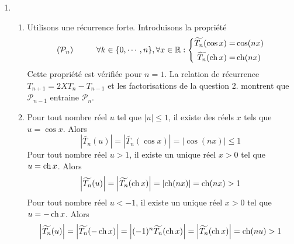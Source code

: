 \begin{enumerate}
\item \begin{enumerate}
 \item Utilisons une récurrence forte. Introduisons la propriété 
\begin{displaymath}
 (\mathcal P_n)\hspace{1cm}\forall k\in\{0,\cdots,n\}, \forall x\in \mathbb{R} :
\left\lbrace
\begin{aligned}
 \widetilde{T_n}(\cos x) =& \cos (nx) \\
 \widetilde{T_n}(\operatorname{ch} x) =& \operatorname{ch} (nx)
\end{aligned}
 \right. 
\end{displaymath}
Cette propriété est vérifiée pour $n=1$. La relation de récurrence $T_{n+1} = 2XT_n - T_{n-1}$ et les factorisations de la question 2. montrent que $\mathcal P_{n-1}$ entraine $\mathcal P_n$.
\item Pour tout nombre réel $u$ tel que $|u|\leq 1$, il existe des réels $x$ tels que $u=\cos x$. Alors
\begin{displaymath}
 \left \vert \widetilde{T_n}(u)\right\vert= \left \vert \widetilde{T_n}(\cos x)\right\vert
= \left \vert \cos(nx)\right\vert \leq 1
\end{displaymath}
Pour tout nombre réel $u>1$, il existe un unique réel $x>0$ tel que $u=\operatorname{ch} x$. Alors
\begin{displaymath}
 \left \vert \widetilde{T_n}(u)\right\vert= \left \vert \widetilde{T_n}(\operatorname{ch} x)\right\vert
= \left \vert \operatorname{ch}(nx)\right\vert = \operatorname{ch}(nx) > 1
\end{displaymath}
Pour tout nombre réel $u<-1$, il existe un unique réel $x>0$ tel que $u=-\operatorname{ch} x$. Alors
\begin{displaymath}
 \left \vert \widetilde{T_n}(u)\right\vert= \left \vert \widetilde{T_n}(-\operatorname{ch} x)\right\vert
= \left \vert (-1)^n\widetilde{T_n}(\operatorname{ch} x)\right\vert  = \left \vert \widetilde{T_n}(\operatorname{ch} x)\right\vert = \operatorname{ch}(nu) > 1
\end{displaymath}


\end{enumerate}
\end{enumerate}
